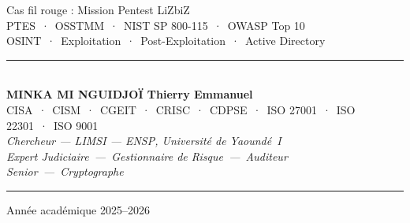\documentclass[12pt, a4paper, twoside, openright]{book}
\begin{document}
\begin{titlepage}
\begin{center}
    {\color{white!70!gray}\small
        \quad Cas fil rouge : Mission Pentest LiZbiZ}\\[0.5ex]
    {\color{white!70!gray}\small
        \quad PTES~·~OSSTMM~·~NIST SP 800-115~·~OWASP Top 10}\\[0.5ex]
    {\color{white!70!gray}\small
        \quad OSINT~·~Exploitation~·~Post-Exploitation~·~Active Directory}
\end{center}

\vfill

\begin{center}
    {\color{CouleurAccent}\rule{0.7\linewidth}{1.2pt}}\\[1.2ex]
    {\color{white}\large\bfseries MINKA MI NGUIDJOÏ Thierry Emmanuel}\\[0.4ex]
    {\color{white!80!gray}\small
        CISA~·~CISM~·~CGEIT~·~CRISC~·~CDPSE~·~ISO 27001~·~ISO 22301~·~ISO 9001}\\[0.3ex]
    {\color{white!70!gray}\footnotesize\itshape
        Chercheur — LIMSI — ENSP, Université de Yaoundé~I}\\[0.3ex]
    {\color{white!70!gray}\footnotesize\itshape
        Expert Judiciaire~—~Gestionnaire de Risque~—~Auditeur Senior~—~Cryptographe}\\[1.2ex]
    {\color{CouleurAccent}\rule{0.7\linewidth}{1.2pt}}
\end{center}

\vspace{0.6cm}

\begin{center}
    {\color{white!60!gray}\small Année académique 2025--2026}
\end{center}

\afterpage{\nopagecolor}
\end{titlepage}

\clearpage
\thispagestyle{empty}
\vspace*{\fill}
\end{document}
